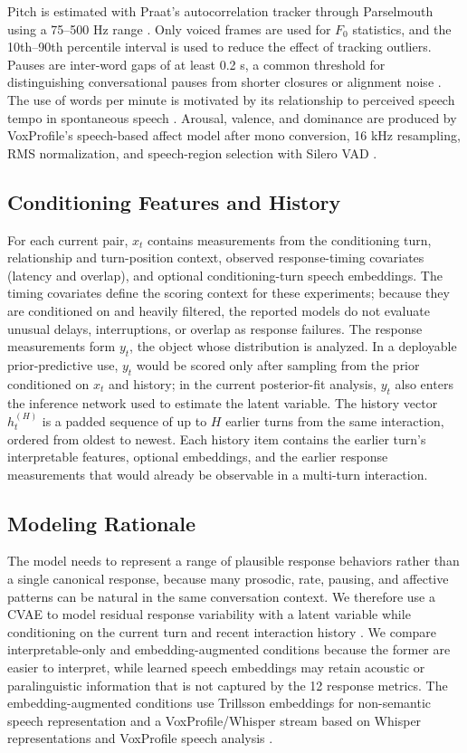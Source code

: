 \documentclass[conference]{IEEEtran}
\begin{document}
Pitch is estimated with Praat's autocorrelation tracker through Parselmouth using a 75--500 Hz range \cite{jadoul2018introducing, vogel2009standardization}.
Only voiced frames are used for $F_0$ statistics, and the 10th--90th percentile interval is used to reduce the effect of tracking outliers.
Pauses are inter-word gaps of at least 0.2 s, a common threshold for distinguishing conversational pauses from shorter closures or alignment noise \cite{campione2002large}.
The use of words per minute is motivated by its relationship to perceived speech tempo in spontaneous speech \cite{iwarsson2023measuring}.
Arousal, valence, and dominance are produced by VoxProfile's speech-based affect model after mono conversion, 16 kHz resampling, RMS normalization, and speech-region selection with Silero VAD \cite{Silero_VAD, feng2025vox}.

\subsection{Conditioning Features and History}
For each current pair, $x_t$ contains measurements from the conditioning turn, relationship and turn-position context, observed response-timing covariates (latency and overlap), and optional conditioning-turn speech embeddings.
The timing covariates define the scoring context for these experiments; because they are conditioned on and heavily filtered, the reported models do not evaluate unusual delays, interruptions, or overlap as response failures.
The response measurements form $y_t$, the object whose distribution is analyzed.
In a deployable prior-predictive use, $y_t$ would be scored only after sampling from the prior conditioned on $x_t$ and history; in the current posterior-fit analysis, $y_t$ also enters the inference network used to estimate the latent variable.
The history vector $h_t^{(H)}$ is a padded sequence of up to $H$ earlier turns from the same interaction, ordered from oldest to newest.
Each history item contains the earlier turn's interpretable features, optional embeddings, and the earlier response measurements that would already be observable in a multi-turn interaction.

\subsection{Modeling Rationale}
The model needs to represent a range of plausible response behaviors rather than a single canonical response, because many prosodic, rate, pausing, and affective patterns can be natural in the same conversation context.
We therefore use a CVAE to model residual response variability with a latent variable while conditioning on the current turn and recent interaction history \cite{kingma2013vae, sohn2015cvae}.
We compare interpretable-only and embedding-augmented conditions because the former are easier to interpret, while learned speech embeddings may retain acoustic or paralinguistic information that is not captured by the 12 response metrics.
The embedding-augmented conditions use Trillsson embeddings for non-semantic speech representation \cite{shor2022trillsson} and a VoxProfile/Whisper stream based on Whisper representations and VoxProfile speech analysis \cite{radford2023whisper, feng2025vox}.
\end{document}
